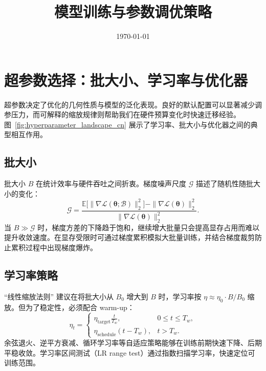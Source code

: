 \documentclass[UTF8,zihao=-4]{ctexart}
\title{模型训练与参数调优策略}
\author{}
\date{\today}
\begin{document}
\maketitle
\tableofcontents
\FloatBarrier

\section{超参数选择：批大小、学习率与优化器}
超参数决定了优化的几何性质与模型的泛化表现。良好的默认配置可以显著减少调参压力，而可解释的缩放规律则帮助我们在硬件预算变化时快速迁移经验。图~\ref{fig:hyperparameter_landscape_cn} 展示了学习率、批大小与优化器之间的典型相互作用。

\subsection{批大小}
批大小 $B$ 在统计效率与硬件吞吐之间折衷。梯度噪声尺度 $\mathcal{G}$ 描述了随机性随批大小的变化：
\begin{equation}
  \mathcal{G} = \frac{\mathbb{E}\bigl[\|\nabla \mathcal{L}(\boldsymbol{\theta}; \mathcal{B})\|_2^2\bigr] - \|\nabla \mathcal{L}(\boldsymbol{\theta})\|_2^2}{\|\nabla \mathcal{L}(\boldsymbol{\theta})\|_2^2}.
\end{equation}
当 $B \gg \mathcal{G}$ 时，梯度方差的下降趋于饱和，继续增大批量只会提高显存占用而难以提升收敛速度。在显存受限时可通过梯度累积模拟大批量训练，并结合梯度裁剪防止累积过程中出现梯度爆炸。

\subsection{学习率策略}
``线性缩放法则'' 建议在将批大小从 $B_0$ 增大到 $B$ 时，学习率按 $\eta \approx \eta_0 \cdot B / B_0$ 缩放。但为了稳定性，必须配合 warm-up：
\begin{equation}
  \eta_t =
  \begin{cases}
    \eta_{\text{target}} \frac{t}{T_w}, & 0 \le t \le T_w, \\
    \eta_{\text{schedule}}(t - T_w), & t > T_w.
  \end{cases}
\end{equation}
余弦退火、逆平方衰减、循环学习率等自适应策略能够在训练前期快速下降、后期平稳收敛。学习率区间测试（LR range test）通过指数扫描学习率，快速定位可训练范围。
\end{document}
